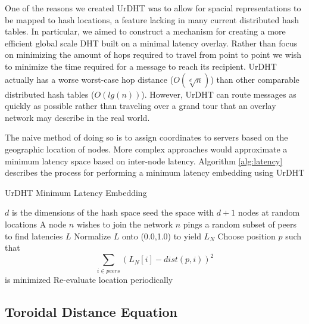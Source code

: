 One of the reasons we created UrDHT \cite{urdht} was to allow for spacial representations to be mapped to hash locations, a feature lacking in many current distributed hash tables.  
In particular, we aimed to construct a mechanism for creating a more efficient global scale DHT built on a minimal latency overlay. 
Rather than focus on minimizing the amount of hops required to travel from point to point we wish to minimize the time required for a message to reach its recipient. 
UrDHT actually has a worse worst-case hop distance ($O(\sqrt[d]{n})$) than other comparable distributed hash tables ($O(lg(n))$). 
However, UrDHT can route messages as quickly as possible rather than traveling over a grand tour that an overlay network may describe in the real world.



The naive method of doing so is to assign coordinates to servers based on the geographic location of nodes. More complex approaches would approximate a minimum latency space based on inter-node latency.
Algorithm \ref{alg:latency} describes the process for performing a minimum latency embedding using UrDHT









\begin{algorithm}
	\caption{UrDHT Minimum Latency Embedding}
	\label{alg:latency}
	\begin{algorithmic}[1]  %
		\State $d$ is the dimensions of the hash space
		\State seed the space with $d+1$ nodes at random locations
		\State A node $n$ wishes to join the network
		\State $n$ pings a random subset of peers to find latencies $L$
		\State Normalize $L$ onto (0.0,1.0) to yield $L_N$
		\State Choose position $p$ such that $$\sum\limits_{i\in peers}(L_N[i]-dist(p,i))^2$$ is minimized
		\State Re-evaluate location periodically
	\end{algorithmic}
\end{algorithm}







\subsection{Toroidal Distance Equation}

